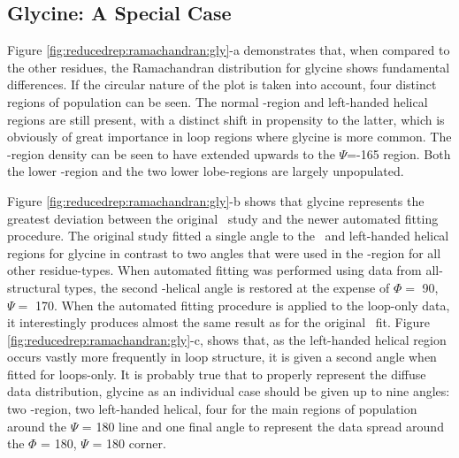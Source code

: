 \subsection{Glycine: A Special Case}

Figure \ref{fig:reducedrep:ramachandran:gly}-a demonstrates that, when compared to the other residues, the Ramachandran distribution for glycine shows fundamental differences. If the circular nature of the plot is taken into account, four distinct regions of population can be seen. The normal \al-region and left-handed helical regions are still present, with a distinct shift in propensity to the latter, which is obviously of great importance in loop regions where glycine is more common. The \be-region density can be seen to have extended upwards to the $\Psi$=-165 region. Both the lower \be-region and the two lower lobe-regions are largely unpopulated. 

Figure \ref{fig:reducedrep:ramachandran:gly}-b shows that glycine represents the greatest deviation between the original \raft\ study and the newer automated fitting procedure. The original study fitted a single angle to the \al\ and left-handed helical regions for glycine in contrast to two angles that were used in the \al-region for all other residue-types. When automated fitting was performed using data from all-structural types, the second \al-helical angle is restored at the expense of $\Phi=$ 90, $\Psi=$ 170. When the automated fitting procedure is applied to the loop-only data, it interestingly produces almost the same result as for the original \raft\ fit. Figure \ref{fig:reducedrep:ramachandran:gly}-c, shows that, as the left-handed helical region occurs vastly more frequently in loop structure, it is given a second angle when fitted for loops-only. 
It is probably true that to properly represent the diffuse data distribution, glycine as an individual case should be given up to nine angles: two \al-region, two left-handed helical, four for the main regions of population around the $\Psi$ = 180 line and one final angle to represent the data spread around the $\Phi$ = 180, $\Psi$ = 180 corner.

